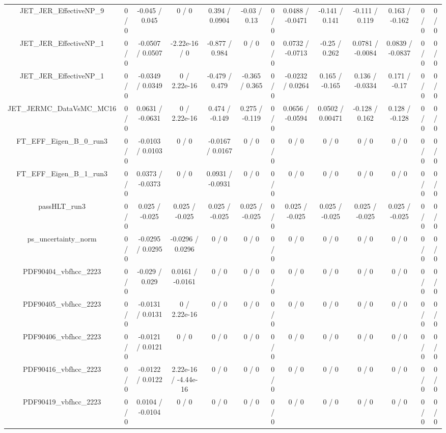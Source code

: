 \documentclass[10pt]{article}
\begin{document}
\begin{table}[htbp]
\begin{center}
\begin{tabular}{|c|c|c|c|c|c|c|c|c|c|c|c|c|}
  JET_JER_EffectiveNP_9 & 0 / 0 & -0.045 / 0.045 & 0 / 0 & 0.394 / 0.0904 & -0.03 / 0.13 & 0 / 0 & 0.0488 / -0.0471 & -0.141 / 0.141 & -0.111 / 0.119 & 0.163 / -0.162 & 0 / 0 & 0 / 0 \\ 
  JET_JER_EffectiveNP_1 & 0 / 0 & -0.0507 / 0.0507 & -2.22e-16 / 0 & -0.877 / 0.984 & 0 / 0 & 0 / 0 & 0.0732 / -0.0713 & -0.25 / 0.262 & 0.0781 / -0.0084 & 0.0839 / -0.0837 & 0 / 0 & 0 / 0 \\ 
  JET_JER_EffectiveNP_1 & 0 / 0 & -0.0349 / 0.0349 & 0 / 2.22e-16 & -0.479 / 0.479 & -0.365 / 0.365 & 0 / 0 & -0.0232 / 0.0264 & 0.165 / -0.165 & 0.136 / -0.0334 & 0.171 / -0.17 & 0 / 0 & 0 / 0 \\ 
  JET_JERMC_DataVsMC_MC16 & 0 / 0 & 0.0631 / -0.0631 & 0 / 2.22e-16 & 0.474 / -0.149 & 0.275 / -0.119 & 0 / 0 & 0.0656 / -0.0594 & 0.0502 / 0.00471 & -0.128 / 0.162 & 0.128 / -0.128 & 0 / 0 & 0 / 0 \\ 
  FT_EFF_Eigen_B_0_run3 & 0 / 0 & -0.0103 / 0.0103 & 0 / 0 & -0.0167 / 0.0167 & 0 / 0 & 0 / 0 & 0 / 0 & 0 / 0 & 0 / 0 & 0 / 0 & 0 / 0 & 0 / 0 \\ 
  FT_EFF_Eigen_B_1_run3 & 0 / 0 & 0.0373 / -0.0373 & 0 / 0 & 0.0931 / -0.0931 & 0 / 0 & 0 / 0 & 0 / 0 & 0 / 0 & 0 / 0 & 0 / 0 & 0 / 0 & 0 / 0 \\ 
  passHLT_run3 & 0 / 0 & 0.025 / -0.025 & 0.025 / -0.025 & 0.025 / -0.025 & 0.025 / -0.025 & 0 / 0 & 0.025 / -0.025 & 0.025 / -0.025 & 0.025 / -0.025 & 0.025 / -0.025 & 0 / 0 & 0 / 0 \\ 
  ps_uncertainty_norm & 0 / 0 & -0.0295 / 0.0295 & -0.0296 / 0.0296 & 0 / 0 & 0 / 0 & 0 / 0 & 0 / 0 & 0 / 0 & 0 / 0 & 0 / 0 & 0 / 0 & 0 / 0 \\ 
  PDF90404_vbfhcc_2223 & 0 / 0 & -0.029 / 0.029 & 0.0161 / -0.0161 & 0 / 0 & 0 / 0 & 0 / 0 & 0 / 0 & 0 / 0 & 0 / 0 & 0 / 0 & 0 / 0 & 0 / 0 \\ 
  PDF90405_vbfhcc_2223 & 0 / 0 & -0.0131 / 0.0131 & 0 / 2.22e-16 & 0 / 0 & 0 / 0 & 0 / 0 & 0 / 0 & 0 / 0 & 0 / 0 & 0 / 0 & 0 / 0 & 0 / 0 \\ 
  PDF90406_vbfhcc_2223 & 0 / 0 & -0.0121 / 0.0121 & 0 / 0 & 0 / 0 & 0 / 0 & 0 / 0 & 0 / 0 & 0 / 0 & 0 / 0 & 0 / 0 & 0 / 0 & 0 / 0 \\ 
  PDF90416_vbfhcc_2223 & 0 / 0 & -0.0122 / 0.0122 & 2.22e-16 / -4.44e-16 & 0 / 0 & 0 / 0 & 0 / 0 & 0 / 0 & 0 / 0 & 0 / 0 & 0 / 0 & 0 / 0 & 0 / 0 \\ 
  PDF90419_vbfhcc_2223 & 0 / 0 & 0.0104 / -0.0104 & 0 / 0 & 0 / 0 & 0 / 0 & 0 / 0 & 0 / 0 & 0 / 0 & 0 / 0 & 0 / 0 & 0 / 0 & 0 / 0 \\ 

\end{tabular}
\end{center}
\end{table}
\end{document}
